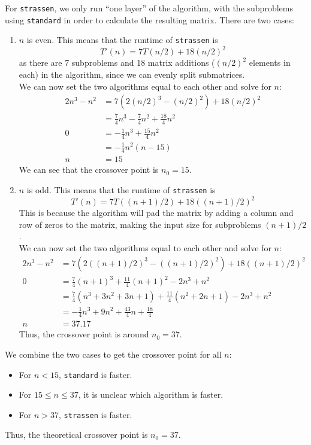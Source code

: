 \documentclass[11pt]{scrartcl}
\theoremstyle{dotlessP}
\theoremstyle{dotlessN}
\theoremstyle{dotN}
\begin{document}
For \texttt{strassen}, we only run ``one layer'' of the algorithm, with the subproblems using \texttt{standard} in
order to calculate the resulting matrix. There are two cases:
\begin{enumerate}
    \item $n$ is even. This means that the runtime of \texttt{strassen} is
        \[
T'(n)=7T(n/2)+18(n/2)^2
        \] 
as there are 7 subproblems and 18 matrix additions ($(n/2)^2$ elements in each) in the algorithm, since we can evenly split submatrices.
\\

We can now set the two algorithms equal to each other and solve for $n$:
\begin{align*}
    2n^3 - n^2 &= 7(2(n/2)^3 - (n/2)^2) + 18(n/2)^2 \\
     &= \frac{7}{4}n^3 - \frac{7}{4}n^2 + \frac{18}{4}n^2 \\
    0 &= -\frac{1}{4}n^3 + \frac{15}{4}n^2 \\
     &= -\frac{1}{4}n^2(n - 15) \\
     n &= 15
\end{align*}
We can see that the crossover point is $n_0 = 15$.
\item $n$ is odd. This means that the runtime of \texttt{strassen} is 
\[
T'(n) = 7T((n+1)/2) + 18((n+1)/2)^2
\] 
    This is because the algorithm will pad the matrix by adding a column and row of zeros to the
    matrix, making the input size for subproblems $(n+1)/2$.
    \\

    We can now set the two algorithms equal to each other and solve for $n$:
    \begin{align*}
        2n^3 - n^2 &= 7(2((n+1)/2)^3 - ((n+1)/2)^2) + 18((n+1)/2)^2 \\
               0    &=\frac{7}{4}(n+1)^{3}+\frac{11}{4}(n+1)^{2}-2n^{3}+n^{2} \\
                    &= \frac{7}{4}\left(n^{3}+3n^{2}+3n+1\right)+\frac{11}{4}\left(n^{2}+2n+1\right)-2n^{3}+n^{2}\\
                    &= -\frac{1}{4}n^{3}+9n^{2}+\frac{43}{4}n+\frac{18}{4} \\
               n&= 37.17
           \end{align*}
           Thus, the crossover point is around $n_0 = 37$.
\end{enumerate}
We combine the two cases to get the crossover point for all $n$:
\begin{itemize}
    \item For $n < 15$, \texttt{standard} is faster. 
    \item For $15 \leq n \leq 37$, it is unclear which algorithm is faster.
        \item For $n > 37$, \texttt{strassen} is faster.
\end{itemize}
Thus, the theoretical crossover point is $n_0 = 37$.
\end{document}
